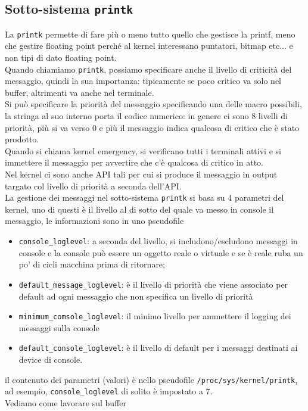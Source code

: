 \documentclass[12pt, oneside]{extbook}
\begin{document}
\subsection{Sotto-sistema \texttt{\texttt{printk}}}
La \texttt{printk} permette di fare più o meno tutto quello che gestisce la printf, meno che gestire floating point perché al kernel interessano puntatori, bitmap etc... e non tipi di dato floating point.\\Quando chiamiamo \texttt{printk}, possiamo specificare anche il livello di criticità del messaggio, quindi la sua importanza: tipicamente se poco critico va solo nel buffer, altrimenti va anche nel terminale.\\Si può specificare la priorità del messaggio specificando una delle macro possibili, la stringa al suo interno porta il codice numerico: in genere ci sono 8 livelli di priorità, più si va verso 0 e più il messaggio indica qualcosa di critico che è stato prodotto.\\Quando si chiama kernel emergency, si verificano tutti i terminali attivi e si immettere il messaggio per avvertire che c'è qualcosa di critico in atto.\\Nel kernel ci sono anche API tali per cui si produce il messaggio in output targato col livello di priorità a seconda dell'API.\\La gestione dei messaggi nel sotto-sistema \texttt{printk} si basa su 4 parametri del kernel, uno di questi è il livello al di sotto del quale va messo in console il messaggio, le informazioni sono in uno pseudofile
\begin{itemize}
\item \texttt{console\_loglevel}: a seconda del livello, si includono/escludono messaggi in console e la console può essere un oggetto reale o virtuale e se è reale ruba un po' di cicli macchina prima di ritornare;
\item \texttt{default\_message\_loglevel}: è il livello di priorità che viene associato per default ad ogni messaggio che non specifica un livello di priorità
\item \texttt{minimum\_comsole\_loglevel}: il minimo livello per ammettere il logging dei messaggi sulla console
\item \texttt{default\_console\_loglevel}: è il livello di default per i messaggi destinati ai device di console.
\end{itemize}
il contenuto dei parametri (valori) è nello pseudofile \texttt{/proc/sys/kernel/printk}, ad esempio, \texttt{console\_loglevel} di solito è impostato a 7.\\Vediamo come lavorare sul buffer
\end{document}
